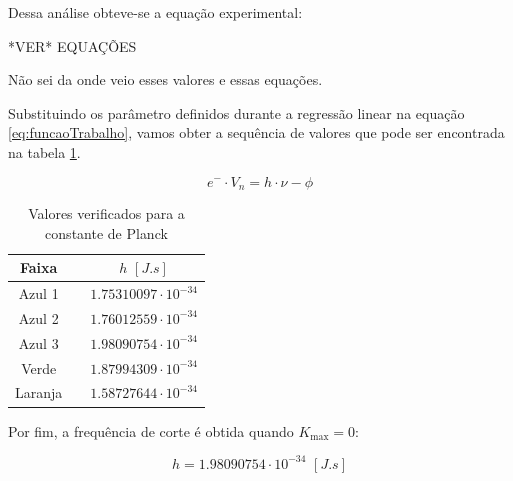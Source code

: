 \documentclass[10pt,twocolumn,letterpaper]{article}
\begin{document}
\noindent Dessa análise obteve-se a equação experimental:

{\Huge \color{red} *VER* EQUAÇÕES}

{\color{red} Não sei da onde veio esses valores e essas equações.}


{
    \color{red}

\hspace{1cm} Substituindo os parâmetro definidos durante a regressão linear na equação \ref{eq:funcaoTrabalho}, vamos obter a sequência de valores que pode ser encontrada na tabela \ref{tab:medicoes_Planck}.

\vspace{-.5cm}

\begin{equation}
    \label{eq:funcaoTrabalho}
    e^-\cdot V_n = h \cdot \nu  - \phi
\end{equation}

\vspace{-.75cm}

\begin{table}[htbp]
    \centering
    \caption{Valores verificados para a constante de Planck}
    \label{tab:medicoes_Planck}
    \vspace{0.25cm}
    \begin{tabular}{ccc}
        \hline
        \rule{0pt}{3ex}\textbf{Faixa} & \hspace{0.25cm} & $h\,\,[J.s]$ \\[5pt]
        \hline
        \rule{0pt}{3ex}Azul 1 & \hspace{0.25cm} & $1.75310097\cdot 10^{-34}$ \\
        Azul 2 & \hspace{0.25cm} & $1.76012559\cdot 10^{-34}$ \\
        Azul 3 & \hspace{0.25cm} & $1.98090754\cdot 10^{-34}$ \\
        Verde & \hspace{0.25cm} & $1.87994309\cdot 10^{-34}$ \\
        Laranja & \hspace{0.25cm} & $1.58727644\cdot 10^{-34}$ \\[5pt]
        \hline
    \end{tabular}
\end{table}

Por fim, a frequência de corte é obtida quando $K_{\max} = 0$:

\vspace{-.25cm}

\begin{equation*}
    h = 1.98090754\cdot 10^{-34} \,\, [J.s]
\end{equation*}

}
\end{document}
